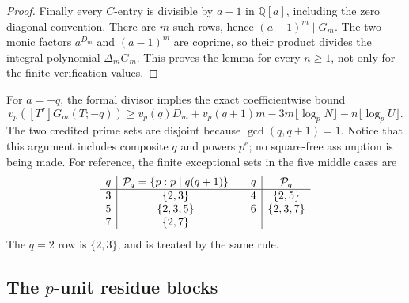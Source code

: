 \begin{proof}
Finally every \(C\)-entry is divisible by \(a-1\) in \(\mathbb Q[a]\),
including the zero diagonal convention.  There are \(m\) such rows, hence
\((a-1)^m\mid G_m\).  The two monic factors \(a^{D_m}\) and \((a-1)^m\)
are coprime, so their product divides the integral polynomial
\(\Delta_mG_m\).  This proves the lemma for every \(n\ge1\), not only for
the finite verification values.
\end{proof}

For \(a=-q\), the formal divisor implies the exact coefficientwise bound
\[
 v_p([T^r]G_m(T;-q))\ge v_p(q)D_m+v_p(q+1)m
       -3m\lfloor\log_pN\rfloor-n\lfloor\log_pU\rfloor .
\]
The two credited prime sets are disjoint because \(\gcd(q,q+1)=1\).  Notice
that this argument includes composite \(q\) and powers \(p^e\); no
square-free assumption is being made.
For reference, the finite exceptional sets in the five middle cases are
\[
\begin{array}{c|c@{\qquad}c|c}
q&\mathcal P_q=\{p:p\mid q(q+1)\}&q&\mathcal P_q\\ \hline
3&\{2,3\}&4&\{2,5\}\\
5&\{2,3,5\}&6&\{2,3,7\}\\
7&\{2,7\}&&
\end{array}
\]
The \(q=2\) row is \(\{2,3\}\), and is treated by the same rule.

\subsection{The $p$-unit residue blocks}

